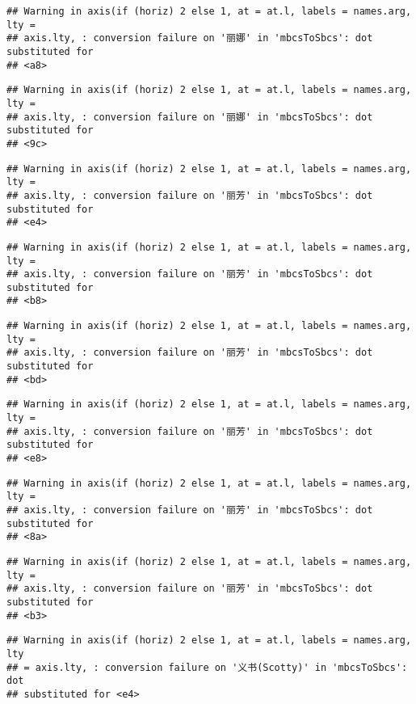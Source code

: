 \documentclass[
]{article}
\begin{document}
\begin{verbatim}
## Warning in axis(if (horiz) 2 else 1, at = at.l, labels = names.arg, lty =
## axis.lty, : conversion failure on '丽娜' in 'mbcsToSbcs': dot substituted for
## <a8>
\end{verbatim}

\begin{verbatim}
## Warning in axis(if (horiz) 2 else 1, at = at.l, labels = names.arg, lty =
## axis.lty, : conversion failure on '丽娜' in 'mbcsToSbcs': dot substituted for
## <9c>
\end{verbatim}

\begin{verbatim}
## Warning in axis(if (horiz) 2 else 1, at = at.l, labels = names.arg, lty =
## axis.lty, : conversion failure on '丽芳' in 'mbcsToSbcs': dot substituted for
## <e4>
\end{verbatim}

\begin{verbatim}
## Warning in axis(if (horiz) 2 else 1, at = at.l, labels = names.arg, lty =
## axis.lty, : conversion failure on '丽芳' in 'mbcsToSbcs': dot substituted for
## <b8>
\end{verbatim}

\begin{verbatim}
## Warning in axis(if (horiz) 2 else 1, at = at.l, labels = names.arg, lty =
## axis.lty, : conversion failure on '丽芳' in 'mbcsToSbcs': dot substituted for
## <bd>
\end{verbatim}

\begin{verbatim}
## Warning in axis(if (horiz) 2 else 1, at = at.l, labels = names.arg, lty =
## axis.lty, : conversion failure on '丽芳' in 'mbcsToSbcs': dot substituted for
## <e8>
\end{verbatim}

\begin{verbatim}
## Warning in axis(if (horiz) 2 else 1, at = at.l, labels = names.arg, lty =
## axis.lty, : conversion failure on '丽芳' in 'mbcsToSbcs': dot substituted for
## <8a>
\end{verbatim}

\begin{verbatim}
## Warning in axis(if (horiz) 2 else 1, at = at.l, labels = names.arg, lty =
## axis.lty, : conversion failure on '丽芳' in 'mbcsToSbcs': dot substituted for
## <b3>
\end{verbatim}

\begin{verbatim}
## Warning in axis(if (horiz) 2 else 1, at = at.l, labels = names.arg, lty
## = axis.lty, : conversion failure on '义书(Scotty)' in 'mbcsToSbcs': dot
## substituted for <e4>
\end{verbatim}
\end{document}
